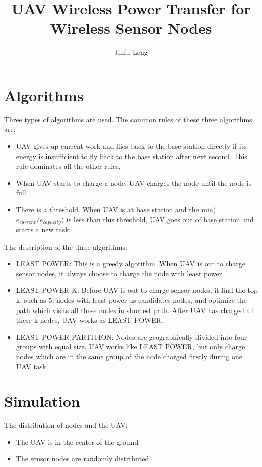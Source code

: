 \documentclass[11pt]{article}
\begin{document}
\title{UAV Wireless Power Transfer for Wireless Sensor Nodes}
\author{Jinfu Leng}
\maketitle
\section{Algorithms}
Three types of algorithms are used. The common rules of these three algorithms are:
\begin{itemize}
\item UAV gives up current work and flies back to the base station directly if its energy is insufficient to fly back to the base station after next second. This rule dominates all the other rules.
\item When UAV starts to charge a node, UAV charges the node until the node is full.
\item There is a threshold. When UAV is at base station and the min($e_{current}/e_{capacity}$) is less than this threshold, UAV goes out of base station and starts a new task.
\end{itemize}
The description of the three algorithms:
\begin{itemize}
\item LEAST POWER: This is a greedy algorithm. When UAV is out to charge sensor nodes, it always choose to charge the node with least power.
\item LEAST POWER K: Before UAV is out to charge sensor nodes, it find the top k, such as 5, nodes with least power as candidates nodes, and optimize the path which visits all these nodes in shortest path. After UAV has charged all these k nodes, UAV works as LEAST POWER.
\item LEAST POWER PARTITION: Nodes are geographically divided into four groups with equal size. UAV works like LEAST POWER, but only charge nodes which are in the same group of the node charged firstly during one UAV task.
\end{itemize}

\section{Simulation}
The distribution of nodes and the UAV:
\begin{itemize}
\item The UAV is in the center of the ground
\item The sensor nodes are randomly distributed
\end{itemize}
\end{document}
